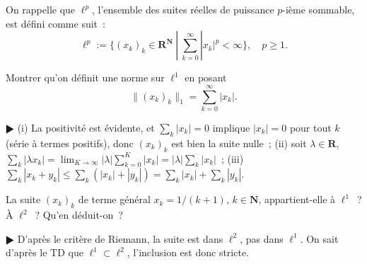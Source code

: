 \documentclass[11pt,a4paper]{article}
\def\N{\mathbf{N}}
\def\R{\mathbf{R}}
\def\iy{\infty}
\def\veps{\varepsilon}
\theoremstyle{plain}
\theoremstyle{definition}
\begin{document}
\begin{Exercice}[7 points]
On rappelle que $\ell^p$, l'ensemble des suites r\'eelles de puissance $p$-i\`eme
sommable, est d\'efini comme suit~:
\[ \ell^p := \{(x_k)_k \in \R^\N\ |\ \sum_{k=0}^\iy |x_k|^p < \iy \},\quad
   p \geq 1. \]

\begin{Question}
Montrer qu'on d\'efinit une norme sur $\ell^1$ en posant
\[ \|(x_k)_k\|_1 = \sum_{k=0}^\iy |x_k|. \]
\end{Question}

\begin{corr} $\RHD$ (i) La positivit\'e est \'evidente, et $\sum_k |x_k|=0$ implique
$|x_k|=0$ pour tout $k$ (s\'erie \`a termes positifs), donc $(x_k)_k$ est bien la
suite nulle~; (ii) soit $\lambda \in \R$, $\sum_k |\lambda x_k|=\lim_{K \to \iy}
|\lambda| \sum_{k=0}^K |x_k| = |\lambda| \sum_k |x_k|$~; (iii) $\sum_k |x_k+y_k| \leq
\sum_k (|x_k|+|y_k|) = \sum_k |x_k| + \sum_k |y_k|$.
\end{corr}

\begin{Question} La suite $(x_k)_k$ de terme g\'en\'eral $x_k=1/(k+1)$, $k \in \N$,
appartient-elle \`a $\ell^1$~? \`A $\ell^2$~? Qu'en d\'eduit-on~?
\end{Question}

\begin{corr} $\RHD$
D'apr\`es le crit\`ere de Riemann, la suite est dans $\ell^2$, pas dans $\ell^1$. On
sait d'apr\`es le TD que $\ell^1 \subset \ell^2$, l'inclusion est donc stricte.
\end{corr}



\end{Exercice}
\end{document}
